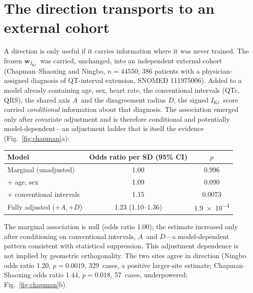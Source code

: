 \documentclass[10pt]{article}
\newcommand{\D}{\ensuremath{D}}
\newcommand{\A}{\ensuremath{A}}
\newcommand{\wikr}{\ensuremath{\mathbf{w}_{I_{\text{Kr}}}}}
\newcommand{\Ikr}{\ensuremath{I_{\text{Kr}}}}
\begin{document}
\section{The direction transports to an external cohort}
A direction is only useful if it carries information where it was never trained. The frozen \wikr\
was carried, unchanged, into an independent external cohort (Chapman--Shaoxing and Ningbo,
$n=\num{44550}$; \num{386} patients with a physician-assigned diagnosis of QT-interval extension,
SNOMED 111975006). Added to a model already containing age, sex, heart rate, the conventional
intervals (QTc, QRS), the shared axis \A\ and the disagreement radius \D, the signed \Ikr\ score
carried \emph{conditional} information about that diagnosis. The association emerged only after
covariate adjustment and is therefore conditional and potentially model-dependent---an adjustment
ladder that is itself the evidence (Fig.~\ref{fig:chapman}a):
\begin{center}\small
\begin{tabular}{lcc}
\toprule
Model & Odds ratio per SD (95\% CI) & $p$ \\
\midrule
Marginal (unadjusted)            & \num{1.00}                       & \num{0.996} \\
$+$ age, sex                     & \num{1.09}                       & \num{0.090} \\
$+$ conventional intervals       & \num{1.15}                       & \num{0.0073} \\
Fully adjusted ($+\A,+\D$)       & \num{1.23} (\numrange{1.10}{1.36}) & \num{1.9e-4} \\
\bottomrule
\end{tabular}
\end{center}
The marginal association is null (odds ratio \num{1.00}); the estimate increased only after
conditioning on conventional intervals, \A\ and \D---a model-dependent pattern consistent with
statistical suppression. This adjustment dependence is not implied by geometric orthogonality.
The two sites agree in direction (Ningbo odds ratio
\num{1.20}, $p=\num{0.0019}$, \num{329}~cases, a positive larger-site estimate;
Chapman--Shaoxing odds ratio \num{1.44}, $p=\num{0.018}$, \num{57}~cases, underpowered;
Fig.~\ref{fig:chapman}b).
\end{document}
